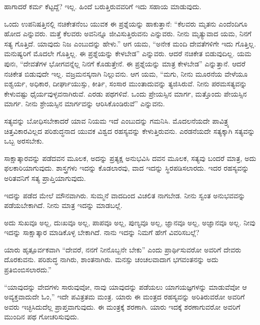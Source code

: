 ಹಾಗಾದರೆ ಕರ್ಮ ಕೆಟ್ಟದ್ದೆ? ಇಲ್ಲ. ಹಿಂದೆ ಬರುತ್ತಿರುವವರಿಗೆ ಇದು ಸಹಾಯ ಮಾಡುವುದು.

ಒಂದು ಉಪನಿಷತ್ತಿನಲ್ಲಿ ನಚಿಕೇತನೆಂಬ ಯುವಕ ಈ ಪ್ರಶ್ನೆಯನ್ನು ಹಾಕುತ್ತಾನೆ: “ಕೆಲವರು ಮೃತನು ಎಂದೆಂದಿಗೂ ಹೋದ ಎನ್ನುವರು. ಮತ್ತೆ ಕೆಲವರು ಅವನಿನ್ನೂ ಜೀವಿಸುತ್ತಿರುವನು ಎನ್ನುವರು. ನೀನು ಮೃತ್ಯುವಾದ ಯಮ, ನಿನಗೆ ಸತ್ಯ ಗೊತ್ತಿದೆ. ಯಾವುದು ನಿಜ ಎಂಬುದನ್ನು ಹೇಳು.” ಆಗ ಯಮ, “ಅನೇಕ ಮಂದಿ ದೇವತೆಗಳಿಗೇ ಇದು ಗೊತ್ತಿಲ್ಲ. ಮನುಷ್ಯರಿಗೆ ಮೊದಲೇ ಗೊತ್ತಿಲ್ಲ. ಈ ಪ್ರಶ್ನೆಯನ್ನು ಕೇಳಬೇಡ” ಎನ್ನುವರು. ಆದರೆ ನಚಿಕೇತ ಬಿಡುವುದಿಲ್ಲ. ಯಮ ಪುನಃ, “ದೇವತೆಗಳ ಭೋಗವನ್ನೆಲ್ಲ ನಿನಗೆ ಕೊಡುತ್ತೇನೆ. ಈ ಪ್ರಶ್ನೆಯನ್ನು ಮಾತ್ರ ಕೇಳಬೇಡ” ಎನ್ನುತ್ತಾನೆ. ಆದರೆ ನಚಿಕೇತ ಬಿಡುವುದೇ ಇಲ್ಲ. ವಜ್ರಮನಸ್ಕನಾಗಿ ನಿಲ್ಲುವನು. ಆಗ ಯಮ, “ಮಗು, ನೀನು ಮೂರನೆಯ ವೇಳೆಯೂ ಐಶ್ವರ್ಯ, ಅಧಿಕಾರ, ದೀರ್ಘಾಯುಸ್ಸು, ಕೀರ್ತಿ, ಸಂಸಾರ ಮುಂತಾದುವನ್ನು ತ್ಯಜಿಸಿರುವೆ. ನೀನು ಪರಮಸತ್ಯವನ್ನು ಕೇಳುವಷ್ಟು ಧೈರ್ಯವುಳ್ಳವನಾಗಿರುವೆ. ಎರಡು ಪಥಗಳಿವೆ. ಒಂದು ಪ್ರೇಯಸ್ಸಿನ ಮಾರ್ಗ, ಮತ್ತೊಂದು ಪೇಯಸ್ಸಿನ ಮಾರ್ಗ. ನೀನು ಶ್ರೇಯಸ್ಸಿನ ಮಾರ್ಗವನ್ನು ಆರಿಸಿಕೊಂಡಿರುವೆ” ಎನ್ನುವನು.

ಸತ್ಯವನ್ನು ಬೋಧಿಸಬೇಕಾದರೆ ಯಾವ ನಿಯಮ ಇದೆ ಎಂಬುದನ್ನು ಗಮನಿಸಿ. ಮೊದಲನೆಯದೇ ಪಾವಿತ್ರ್ಯ ಚಿತ್ತವಿಕಾರವಿಲ್ಲದ ಪರಿಶುದ್ಧನಾದ ಯುವಕ ವಿಶ್ವದ ರಹಸ್ಯವನ್ನು ಕೇಳುತ್ತಿರುವನು. ಎರಡನೆಯದೇ ಸತ್ಯಕ್ಕಾಗಿ ಸತ್ಯವನ್ನು ಒಬ್ಬ ಅರಸಬೇಕು.

ಸಾಕ್ಷಾತ್ಕಾರವನ್ನು ಪಡೆದವನ ಮೂಲಕ, ಅದನ್ನು ಪ್ರತ್ಯಕ್ಷ ಅನುಭವಿಸಿ ದವನ ಮೂಲಕ, ಸತ್ಯವು ಬಂದರೆ ಮಾತ್ರ, ಅದು ಫಲಕಾರಿಯಾಗುವುದು. ಶಾಸ್ತ್ರಗಳು ಇದನ್ನು ಕೊಡಲಾರವು, ವಾದ ಇದನ್ನು ಸ್ಥಿರಪಡಿಸಲಾರದು. ಇದರ ರಹಸ್ಯವನ್ನು ಅರಿತವನಿಗೆ ಸತ್ಯ ಪ್ರಾಪ್ತಿಯಾಗುವುದು.

ಇದನ್ನು ಪಡೆದ ಮೇಲೆ ಮೌನವಾಗಿರು. ಸುಮ್ಮನೆ ವಾದದಿಂದ ವಿಚಲಿತ ನಾಗಬೇಡ. ನೀನು ಸ್ವಂತ ಅನುಭವವನ್ನು ಪಡೆಯಬೇಕಾಗಿದೆ. ನೀನು ಮಾತ್ರ ಇದನ್ನು ಮಾಡಬಲ್ಲೆ.

ಅದು ಸುಖವೂ ಅಲ್ಲ, ದುಃಖವೂ ಅಲ್ಲ, ಪಾಪವೂ ಅಲ್ಲ, ಪುಣ್ಯವೂ ಅಲ್ಲ, ಜ್ಞಾನವೂ ಅಲ್ಲ, ಅಜ್ಞಾನವೂ ಅಲ್ಲ. ನೀವು ಇದನ್ನು ಸಾಕ್ಷಾತ್ಕಾರ ಮಾಡಿಕೊಳ್ಳ ಬೇಕಾಗಿದೆ. ನಾನು ಇದನ್ನು ನಿಮಗೆ ಹೇಗೆ ವಿವರಿಸಬಲ್ಲೆ?

ಯಾರು ಹೃತ್ಪೂರ್ವಕವಾಗಿ “ದೇವರೆ, ನನಗೆ ನೀನೊಬ್ಬನೇ ಬೇಕು” ಎಂದು ಪ್ರಾರ್ಥಿಸುವರೋ ಅವರಿಗೆ ದೇವರು ದೊರಕುವನು. ಪರಿಶುದ್ಧ ನಾಗಿರು, ಶಾಂತನಾಗಿರು. ಮನಸ್ಸು ಚಂಚಲವಾದಾಗ ಭಗವಂತನನ್ನು ಅದು ಪ್ರತಿಬಿಂಬಿಸಲಾರದು.”

“ಯಾವುದನ್ನು ವೇದಗಳು ಸಾರುವುವೋ, ನಾವು ಯಾವುದನ್ನು ಪಡೆಯಲು ಯಾಗಯಜ್ಞಗಳನ್ನು ಮಾಡುವೆವೋ ಆ ಅವ್ಯಕ್ತವಾದುದೇ ಓಂ,” ಇದೇ ಪವಿತ್ರತಮ ಮಂತ್ರ. ಯಾರು ಈ ಮಂತ್ರದ ರಹಸ್ಯವನ್ನು ಅರಿತಿರುವರೋ ಅವರಿಗೆ ಅವರು ಇಚ್ಛಿಸಿದುದೆಲ್ಲ ಪ್ರಾಪ್ತವಾಗುವುದು. ಈ ಮಂತ್ರಕ್ಕೆ ಶರಣಾಗಿ. ಯಾರು ಇದಕ್ಕೆ ಶರಣಾಗುವರೋ ಅವರಿಗೆ ಮುಂದಿನ ಪಥ ಗೋಚರಿಸುವುದು.


